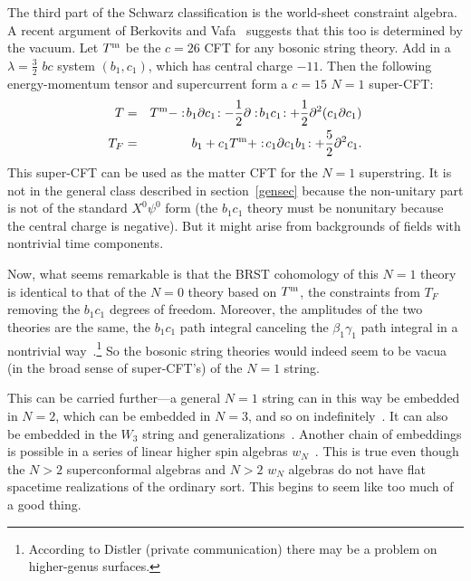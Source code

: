 
The third part of the Schwarz classification is the world-sheet
constraint algebra.  A recent argument of Berkovits and
Vafa~\cite{BV} suggests that this too is determined by the vacuum. 
Let $T^{\rm m}$ be the $c = 26$ CFT for any bosonic string theory. 
Add in a
$\lambda = \frac{3}{2}$ $bc$ system $(b_1,c_1)$, which has
central charge $-11$.  Then the following energy-momentum tensor
and supercurrent form a $c = 15$ $N=1$ super-CFT:
\begin{eqnarray}
T &=& T^{\rm m} - :\! b_1 \partial c_1  \! :
- \frac{1}{2} \partial :\! b_1 c_1 \! : + \frac{1}{2} \partial^2
(c_1 \partial c_1) \nonumber\\
T_F &=& b_1 + c_1 T^{\rm m} +:\! c_1 \partial c_1 b_1 \! :
+ \frac{5}{2} \partial^2 c_1 .  \label{bv}
\end{eqnarray}
This super-CFT can be used as the matter CFT for the $N=1$
superstring.  It is not in the general class described in
section~\ref{gensec} because the non-unitary part is not of the
standard $X^0 \psi^0$ form (the $b_1 c_1$ theory must be
nonunitary because the central charge is negative).  But it might
arise from backgrounds of fields with nontrivial time
components.

Now, what seems remarkable is that the BRST cohomology of this
$N=1$ theory is identical to that of the $N=0$ theory based on
$T^{\rm m}$, the constraints from $T_F$ removing the $b_1 c_1$
degrees of freedom.  Moreover, the amplitudes of the two theories
are the same, the $b_1 c_1$ path integral canceling the $\beta_1
\gamma_1$ path integral in a nontrivial way~\cite{BV}.\footnote
{According to Distler (private communication) there may be a problem on
higher-genus surfaces.}
So the bosonic
string theories would indeed seem to be vacua (in the broad sense
of super-CFT's) of the $N=1$ string.

This can be carried further---a general $N=1$ string can in this way
be embedded in $N=2$, which can be embedded in $N=3$, and so on 
indefinitely~\cite{BOP}.
It can also be embedded in the $W_3$ string
and generalizations~\cite{BFW}.
Another chain of embeddings is possible
in a series of linear higher spin algebras $w_N$~\cite{KST}.
This is true even though the $N >
2$ superconformal algebras and $N > 2$ $w_N$ algebras do not have flat
spacetime realizations of the ordinary sort.  This begins to seem
like too much of a good thing.

